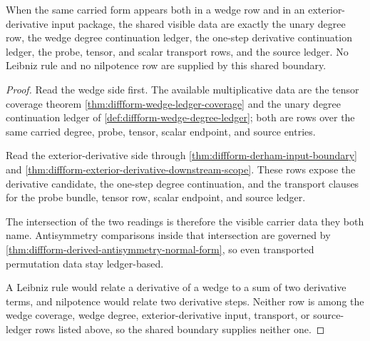 \begin{theorem}
\label{thm:diffform-wedge-derivative-input-boundary}
When the same carried form appears both in a wedge row and in an
exterior-derivative input package, the shared visible data are exactly the
unary degree row, the wedge degree continuation ledger, the one-step derivative
continuation ledger, the probe, tensor, and scalar transport rows, and the
source ledger. No Leibniz rule and no nilpotence row are supplied by this
shared boundary.
\end{theorem}
\begin{proof}
Read the wedge side first. The available multiplicative data are the tensor
coverage theorem \autoref{thm:diffform-wedge-ledger-coverage} and the unary
degree continuation ledger of
\autoref{def:diffform-wedge-degree-ledger}; both are rows over the same carried
degree, probe, tensor, scalar endpoint, and source entries.

Read the exterior-derivative side through
\autoref{thm:diffform-derham-input-boundary} and
\autoref{thm:diffform-exterior-derivative-downstream-scope}. These rows expose
the derivative candidate, the one-step degree continuation, and the transport
clauses for the probe bundle, tensor row, scalar endpoint, and source ledger.

The intersection of the two readings is therefore the visible carrier data
they both name. Antisymmetry comparisons inside that intersection are governed
by \autoref{thm:diffform-derived-antisymmetry-normal-form}, so even transported
permutation data stay ledger-based.

A Leibniz rule would relate a derivative of a wedge to a sum of two derivative
terms, and nilpotence would relate two derivative steps. Neither row is among
the wedge coverage, wedge degree, exterior-derivative input, transport, or
source-ledger rows listed above, so the shared boundary supplies neither one.
\end{proof}

\begin{closurestatus}{\DiffFormUp}
  \theoryclosure{\seedClosure}
  \formalstatus{\unformalizedV}
\end{closurestatus}
